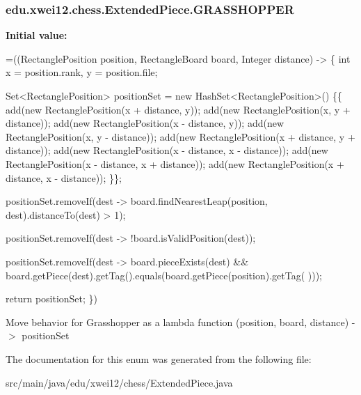 \subsubsection[{\texorpdfstring{G\+R\+A\+S\+S\+H\+O\+P\+P\+ER}{GRASSHOPPER}}]{\setlength{\rightskip}{0pt plus 5cm}edu.\+xwei12.\+chess.\+Extended\+Piece.\+G\+R\+A\+S\+S\+H\+O\+P\+P\+ER}\hypertarget{enumedu_1_1xwei12_1_1chess_1_1_extended_piece_a383870e686af1f61cec618abbe02996d}{}\label{enumedu_1_1xwei12_1_1chess_1_1_extended_piece_a383870e686af1f61cec618abbe02996d}
{\bfseries Initial value\+:}
\begin{DoxyCode}
=((RectanglePosition position, RectangleBoard board, Integer distance) -> \{
        \textcolor{keywordtype}{int} x = position.rank, y = position.file;

        Set<RectanglePosition> positionSet = \textcolor{keyword}{new} HashSet<RectanglePosition>() \{\{
            add(\textcolor{keyword}{new} RectanglePosition(x + distance, y));
            add(\textcolor{keyword}{new} RectanglePosition(x, y + distance));
            add(\textcolor{keyword}{new} RectanglePosition(x - distance, y));
            add(\textcolor{keyword}{new} RectanglePosition(x, y - distance));
            add(\textcolor{keyword}{new} RectanglePosition(x + distance, y + distance));
            add(\textcolor{keyword}{new} RectanglePosition(x - distance, x - distance));
            add(\textcolor{keyword}{new} RectanglePosition(x - distance, x + distance));
            add(\textcolor{keyword}{new} RectanglePosition(x + distance, x - distance));
        \}\};

        
        positionSet.removeIf(dest -> board.findNearestLeap(position, dest).distanceTo(dest) > 1);
        
        positionSet.removeIf(dest -> !board.isValidPosition(dest));
        
        positionSet.removeIf(dest -> board.pieceExists(dest) &&
                                      board.getPiece(dest).getTag().equals(board.getPiece(position).getTag(
      )));

        \textcolor{keywordflow}{return} positionSet;
    \})
\end{DoxyCode}
Move behavior for Grasshopper as a lambda function (position, board, distance) -\/$>$ position\+Set 

The documentation for this enum was generated from the following file\+:\begin{DoxyCompactItemize}
\item 
src/main/java/edu/xwei12/chess/Extended\+Piece.\+java\end{DoxyCompactItemize}
